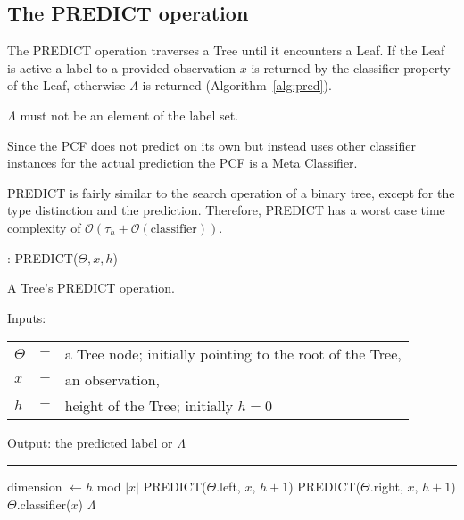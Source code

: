 \subsection{The PREDICT operation}

The PREDICT operation traverses a Tree until it encounters
a Leaf. If the Leaf is active a label to a provided
observation $x$ is returned by the classifier
property of the Leaf, otherwise $\Lambda$ is returned
(Algorithm~\ref{alg:pred}).

$\Lambda$ must not be an element of the label set.

Since the PCF does not predict on its own but instead uses
other classifier instances for the actual prediction the
PCF is a Meta Classifier.\cite[chapter 4.6]{pymvpa}

PREDICT is fairly similar to the search operation of a
binary tree, except for the type distinction and the
prediction.\cite[chapter 12.2]{Cormen} Therefore, PREDICT
has a worst case time complexity of $\mathcal{O}(\tau_h +
\mathcal{O}(\text{classifier}))$.

\begin{algorithm}
  \caption{: PREDICT($\Theta, x, h$)}%
  \label{alg:pred}
  A Tree's PREDICT operation.

  Inputs:

    \begin{tabu}{llX}
    $\Theta$ &$-$ &a Tree node; initially pointing to the
      root of the Tree,\\
    $x$ &$-$ &an observation,\\
    $h$ &$-$ &height of the Tree; initially $h = 0$
    \end{tabu}

  Output: the predicted label or $\Lambda$

  \noindent\rule{\linewidth}{0.4pt}

  \begin{algorithmic}[1]
      \STATE dimension $\leftarrow h$ mod $|x|$
        \STATE PREDICT($\Theta$.left, $x$, $h + 1$)
      \ELSE
        \STATE PREDICT($\Theta$.right, $x$, $h + 1$)
      \ENDIF
      \RETURN $\Theta$.classifier($x$)
    \ELSE
      \RETURN $\Lambda$
    \ENDIF
  \end{algorithmic}
\end{algorithm}

